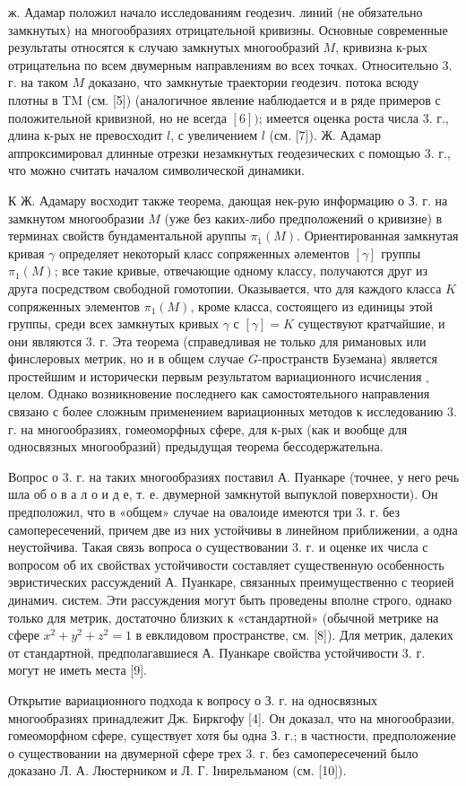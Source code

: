 \documentclass[10pt]{article}
\begin{document}
ж. Адамар положил начало исследованиям геодезич. линий (не обязательно замкнутых) на многообразиях отрицательной кривизны. Основные современные результаты относятся к случаю замкнутых многообразий $M$, кривизна к-рых отрицательна по всем двумерным направлениям во всех точках. Относительно 3. г. на таком $M$ доказано, что замкнутые траектории геодезич. потока всюду плотны в TM (см. [5]) (аналогичное явление наблюдается и в ряде примеров с положительной кривизной, но не всегда $[6])$; имеется оценка роста числа 3. г., длина к-рых не превосходит $l$, с увеличением $l$ (см. [7]). Ж. Адамар аппроксимировал длинные отрезки незамкнутых геодезических с помощью 3. г., что можно считать началом символической динамики.



К Ж. Адамару восходит также теорема, дающая нек-рую информацию о З. г. на замкнутом многообразии $M$ (уже без каких-либо предположений о кривизне) в терминах свойств бундаментальной аруппы $\pi_{1}(M)$. Ориентированная замкнутая кривая $\gamma$ определяет некоторый класс сопряженных әлементов $[\gamma]$ группы $\pi_{1}(M)$; все такие кривые, отвечающие одному классу, получаются друг из друга посредством свободной гомотопии. Оказывается, что для каждого класса $K$ сопряженных элементов $\pi_{1}(M)$, кроме класса, состоящего из единицы этой группы, среди всех замкнутых кривых $\gamma$ с $[\gamma]=K$ существуют кратчайшие, и они являются 3. г. Эта теорема (справедливая не только для римановых или финслеровых метрик, но и в общем случае $G$-пространств Буземана) является простейшим и исторически первым результатом вариационного исчисления ${ }_{\circ}$ целом. Однако возникновение последнего как самостоятельного направления связано с более сложным применением вариационных методов к исследованию 3. г. на многообразиях, гомеоморфных сфере, для к-рых (как и вообще для односвязных многообразий) предыдущая теорема бессодержательна.



Вопрос о 3. г. на таких многообразиях поставил А. Пуанкаре (точнее, у него речь шла об о в а л о и д е, т. е. двумерной замкнутой выпуклой поверхности). Он предположил, что в «общем» случае на овалоиде имеются три 3. г. без самопересечений, причем две из них устойчивы в линейном приближении, а одна неустойчива. Такая связь вопроса о существовании 3. г. и оценке их числа с вопросом об их свойствах устойчивости составляет существенную особенность эвристических рассуждений А. Пуанкаре, связанных преимущественно с теорией динамич. систем. Эти рассуждения могут быть проведены вполне строго, однако только для метрик, достаточно близких к «стандартной» (обычной метрике на сфере $x^{2}+y^{2}+z^{2}=1$ в евклидовом пространстве, см. [8]). Для метрик, далеких от стандартной, предполагавшиеся А. Пуанкаре свойства устойчивости 3. г. могут не иметь места [9].



Открытие вариационного подхода к вопросу о З. г. на односвязных многообразиях принадлежит Дж. Биркгофу [4]. Он доказал, что на многообразии, гомеоморфном сфере, существует хотя бы одна З. г.; в частности, предположение о существовании на двумерной сфере трех 3. г. без самопересечений было доказано Л. А. Люстерником и Л. Г. Інирельманом (см. [10]).
\end{document}
